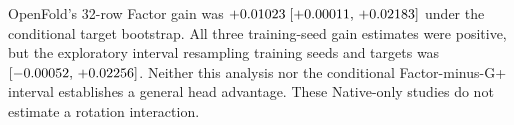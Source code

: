 OpenFold's 32-row Factor gain was $+0.01023\;[+0.00011,\,+0.02183]$ under the
conditional target bootstrap. All three training-seed gain estimates were
positive, but the exploratory interval resampling training seeds and
targets was $[-0.00052,\,+0.02256]$. Neither this analysis nor
the conditional Factor-minus-G+ interval establishes a general head
advantage. These Native-only studies do not estimate a rotation interaction.
